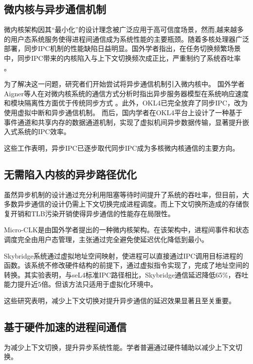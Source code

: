 \subsection{微内核与异步通信机制}

微内核架构因其“最小化”的设计理念被广泛应用于高可信度场景，然而,越来越多的用户态系统服务使得进程间通信成为系统性能的主要瓶颈。随着多核处理器广泛部署，同步IPC机制的性能缺陷日益明显。国外学者指出，在任务切换频繁场景中，同步IPC带来的内核陷入与上下文切换频次成正比，严重制约了系统吞吐率 \cite{reichmann2015ipcperformance}。

为了解决这一问题，研究者们开始尝试将异步通信机制引入微内核中。
国外学者Aigner等人在对微内核系统的通信方式分析时指出异步服务器模型在系统响应速度和模块隔离性方面优于传统同步方式 \cite{2011Communication}。此外，OKL4已完全放弃了同步IPC，改为使用虚拟中断和异步通信机制\cite{varanasi2010okl4}。
而后，国内学者在OKL4平台上设计了一种基于事件通道和共享内存的数据通道机制，实现了虚拟机间异步数据传输，显著提升嵌入式系统的IPC效率\cite{wang2017efficient}。

这些工作表明，异步IPC已逐步取代同步IPC成为多核微内核通信的主要方向。

\subsection{无需陷入内核的异步路径优化}

虽然异步机制的设计通过充分利用阻塞等待时间提升了系统的吞吐率，但目前，大多数异步通信的设计仍需上下文切换完成进程调度。而上下文切换所造成的存储恢复开销和TLB污染开销使得异步通信的性能存在局限性。

Micro-CLK是由国外学者提出的一种微内核架构。在该架构中，进程间事件和状态调度完全由用户态管理，主张通过完全避免使延迟优化降低到最小\cite{Klimiankou2021microclk}。

Skybridge系统\cite{2019SkyBridge}通过虚拟地址空间映射，使进程可以直接通过IPC调用目标进程的函数。该系统不修改硬件结构的前提下，通过虚拟指令实现了，完成了地址空间的转换。其实验表明，与seL4标准IPC路径相比，Skybridge通信延迟降低65\%，吞吐能力提升近5倍。但该方法只适用于虚拟化环境中。

这些研究表明，减少上下文切换对提升异步通信的延迟效果显著且至关重要。

\subsection{基于硬件加速的进程间通信}

为减少上下文切换，提升异步系统性能。学者普遍通过硬件辅助以减少上下文切换。

